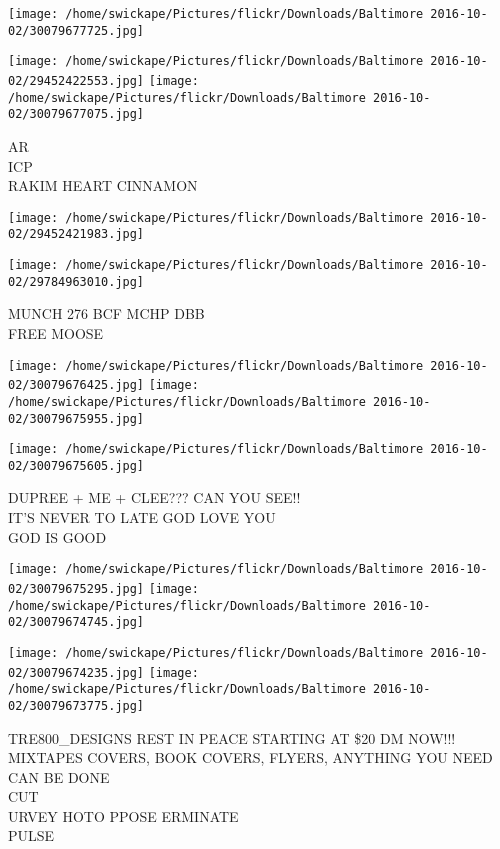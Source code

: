 \documentclass[10pt,letterpaper]{article}
\begin{document}
\texttt{[image: /home/swickape/Pictures/flickr/Downloads/Baltimore 2016-10-02/30079677725.jpg]}

\vspace{0.25in}
\texttt{[image: /home/swickape/Pictures/flickr/Downloads/Baltimore 2016-10-02/29452422553.jpg]}
\texttt{[image: /home/swickape/Pictures/flickr/Downloads/Baltimore 2016-10-02/30079677075.jpg]}

AR\\
ICP\\
RAKIM HEART CINNAMON
\pagebreak

\texttt{[image: /home/swickape/Pictures/flickr/Downloads/Baltimore 2016-10-02/29452421983.jpg]}

\vspace{0.25in}
\texttt{[image: /home/swickape/Pictures/flickr/Downloads/Baltimore 2016-10-02/29784963010.jpg]}

MUNCH 276 BCF MCHP DBB\\
FREE MOOSE
\pagebreak

\texttt{[image: /home/swickape/Pictures/flickr/Downloads/Baltimore 2016-10-02/30079676425.jpg]}
\texttt{[image: /home/swickape/Pictures/flickr/Downloads/Baltimore 2016-10-02/30079675955.jpg]}

\vspace{0.25in}
\texttt{[image: /home/swickape/Pictures/flickr/Downloads/Baltimore 2016-10-02/30079675605.jpg]}

DUPREE + ME + CLEE??? CAN YOU SEE!!\\
IT'S NEVER TO LATE GOD LOVE YOU\\
GOD IS GOOD
\pagebreak

\texttt{[image: /home/swickape/Pictures/flickr/Downloads/Baltimore 2016-10-02/30079675295.jpg]}
\texttt{[image: /home/swickape/Pictures/flickr/Downloads/Baltimore 2016-10-02/30079674745.jpg]}

\texttt{[image: /home/swickape/Pictures/flickr/Downloads/Baltimore 2016-10-02/30079674235.jpg]}
\texttt{[image: /home/swickape/Pictures/flickr/Downloads/Baltimore 2016-10-02/30079673775.jpg]}

TRE800\_DESIGNS REST IN PEACE STARTING AT \$20 DM NOW!!! MIXTAPES COVERS, BOOK COVERS, FLYERS, ANYTHING YOU NEED CAN BE DONE\\
CUT\\
URVEY HOTO PPOSE ERMINATE\\
PULSE
\pagebreak
\end{document}

